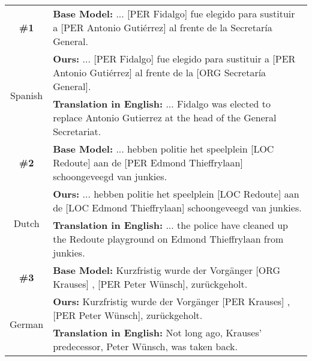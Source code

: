 \documentclass[letterpaper]{article} \usepackage{aaai20}  \usepackage{times}  \usepackage{helvet} \usepackage{courier}  \usepackage[hyphens]{url}  \usepackage{graphicx} \urlstyle{rm} \def\UrlFont{\rm}  \usepackage{graphicx}
\begin{document}
\begin{table*}[t]
  \centering
    \begin{adjustbox}{max width=0.88\textwidth}
    \begin{tabular}{|c|l|}
      \hline
\textbf{\#1} & \textbf{Base Model: }... \colorbox[rgb]{0.80, 0.98, 0.85}{[{\scriptsize PER} Fidalgo]} fue elegido para sustituir a \colorbox[rgb]{0.80, 0.98, 0.85}{[{\scriptsize PER} Antonio Gutiérrez]} al frente de la \colorbox[rgb]{0.97, 0.82, 0.80}{Secretaría General}.\\
\multirow{2}{*}{Spanish} & \textbf{Ours: }...  \colorbox[rgb]{0.80, 0.98, 0.85}{[{\scriptsize PER} Fidalgo]} fue elegido para sustituir a \colorbox[rgb]{0.80, 0.98, 0.85}{[{\scriptsize PER} Antonio Gutiérrez]} al frente de la \colorbox[rgb]{0.80, 0.98, 0.85}{[{\scriptsize ORG} Secretaría General]}.\\
& \textbf{Translation in English: }\colorbox[rgb]{1, 1, 1}{... Fidalgo was elected to replace Antonio Gutierrez at the head of the General Secretariat.}\\
        \hline
        \hline
         
        \textbf{\#2} & \textbf{Base Model: }... hebben politie het speelplein \colorbox[rgb]{0.80, 0.98, 0.85}{[{\scriptsize LOC} Redoute]} aan de \colorbox[rgb]{0.97, 0.82, 0.80}{[{\scriptsize PER} Edmond Thieffrylaan]} schoongeveegd van junkies.\\
\multirow{2}{*}{Dutch} & \textbf{Ours: }... hebben politie het speelplein \colorbox[rgb]{0.80, 0.98, 0.85}{[{\scriptsize LOC} Redoute]} aan de \colorbox[rgb]{0.80, 0.98, 0.85}{[{\scriptsize LOC} Edmond Thieffrylaan]} schoongeveegd van junkies.\\
& \textbf{Translation in English: }\colorbox[rgb]{1, 1, 1}{... the police have cleaned up the Redoute playground on Edmond Thieffrylaan from junkies.}\\
        \hline
        \hline
         
        \textbf{\#3} & \textbf{Base Model: }
        Kurzfristig wurde der Vorgänger \colorbox[rgb]{0.97, 0.82, 0.80}{[{\scriptsize ORG} Krauses]} , \colorbox[rgb]{0.80, 0.98, 0.85}{[{\scriptsize PER} Peter Wünsch]}, zurückgeholt.\\
\multirow{2}{*}{German} & \textbf{Ours: }
        Kurzfristig wurde der Vorgänger \colorbox[rgb]{0.80, 0.98, 0.85}{[{\scriptsize PER} Krauses]} , \colorbox[rgb]{0.80, 0.98, 0.85}{[{\scriptsize PER} Peter Wünsch]}, zurückgeholt.\\
& \textbf{Translation in English: }\colorbox[rgb]{1, 1, 1}{Not long ago, Krauses' predecessor, Peter Wünsch, was taken back.}\\
        \hline
        \hline
         



\end{tabular}
\end{adjustbox}
\end{table*}
\end{document}
